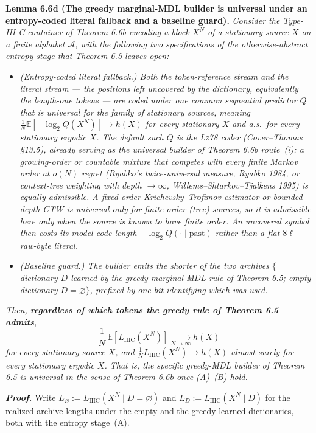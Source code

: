 \documentclass[
]{article}
\begin{document}
\textbf{Lemma 6.6d (The greedy marginal-MDL builder is universal under
an entropy-coded literal fallback and a baseline guard).} \emph{Consider
the Type-III-C container of Theorem 6.6b encoding a block $X^N$ of a
stationary source $X$ on a finite alphabet $\mathcal{A}$, with the
following two specifications of the otherwise-abstract entropy stage that
Theorem 6.5 leaves open:}
\begin{itemize}
\item[(A)] \emph{(Entropy-coded literal fallback.) Both the
token-reference stream and the literal stream --- the positions left
uncovered by the dictionary, equivalently the length-one tokens --- are
coded under one common sequential predictor $Q$ that is universal for the
family of stationary sources, meaning $\tfrac1N \mathbb{E}[-\log_2
Q(X^N)] \to h(X)$ for every stationary $X$ and a.s.\ for every stationary
ergodic $X$. The default such $Q$ is the \textsc{Lz78} coder
(Cover--Thomas \S13.5), already serving as the universal builder of
Theorem 6.6b route~(i); a growing-order or countable mixture that
competes with every finite Markov order at $o(N)$ regret (Ryabko's
twice-universal measure, Ryabko 1984, or context-tree weighting
with depth $\to\infty$, Willems--Shtarkov--Tjalkens 1995) is
equally admissible. A \emph{fixed}-order
Krichevsky--Trofimov estimator or bounded-depth CTW is universal only for
finite-order (tree) sources, so it is admissible here only when the
source is known to have finite order. An uncovered symbol then costs its
model code length $-\log_2 Q(\cdot \mid \mathrm{past})$ rather than a flat
$8\ell$ raw-byte literal.}
\item[(B)] \emph{(Baseline guard.) The builder emits the shorter of the
two archives $\{$dictionary $D$ learned by the greedy marginal-MDL rule
of Theorem 6.5; empty dictionary $D = \varnothing\}$, prefixed by one bit
identifying which was used.}
\end{itemize}
\emph{Then, \textbf{regardless of which tokens the greedy rule of
Theorem 6.5 admits},}
\[
\frac{1}{N}\,\mathbb{E}\!\left[L_{\mathrm{IIIC}}(X^N)\right]
\xrightarrow[N\to\infty]{} h(X)
\]
\emph{for every stationary source $X$, and $\tfrac{1}{N}
L_{\mathrm{IIIC}}(X^N) \to h(X)$ almost surely for every stationary
ergodic $X$. That is, the specific greedy-MDL builder of Theorem 6.5 is
universal in the sense of Theorem 6.6b once (A)--(B) hold.}

\emph{\textbf{Proof.}} Write $L_\varnothing :=
L_{\mathrm{IIIC}}(X^N \mid D = \varnothing)$ and $L_D :=
L_{\mathrm{IIIC}}(X^N \mid D)$ for the realized archive lengths under the
empty and the greedy-learned dictionaries, both with the entropy
stage~(A).
\end{document}
